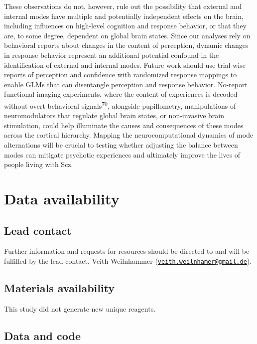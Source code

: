 \documentclass[
]{article}
\begin{document}
These observations do not, however, rule out the possibility that
external and internal modes have multiple and potentially independent
effects on the brain, including influences on high-level cognition and
response behavior, or that they are, to some degree, dependent on global
brain states. Since our analyses rely on behavioral reports about
changes in the content of perception, dynamic changes in response
behavior represent an additional potential confound in the
identification of external and internal modes. Future work should use
trial-wise reports of perception and confidence with randomized response
mappings to enable GLMs that can disentangle perception and response
behavior. No-report functional imaging experiments, where the content of
experiences is decoded without overt behavioral
signals\textsuperscript{70}, alongside pupillometry, manipulations of
neuromodulators that regulate global brain states, or non-invasive brain
stimulation, could help illuminate the causes and consequences of these
modes across the cortical hierarchy. Mapping the neurocomputational
dynamics of mode alternations will be crucial to testing whether
adjusting the balance between modes can mitigate psychotic experiences
and ultimately improve the lives of people living with Scz.

\section{Data availability}\label{data-availability}

\subsection{Lead contact}\label{lead-contact}

Further information and requests for resources should be directed to and
will be fulfilled by the lead contact, Veith Weilnhammer
(\href{mailto:veith.weilnhamer@gmail.de}{\nolinkurl{veith.weilnhamer@gmail.de}}).

\subsection{Materials availability}\label{materials-availability}

This study did not generate new unique reagents.

\subsection{Data and code}\label{data-and-code}
\end{document}
